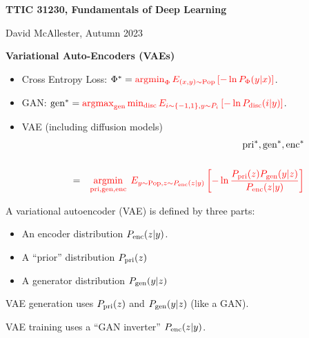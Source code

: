 




{\Huge

  \centerline{\bf TTIC 31230, Fundamentals of Deep Learning}

\bigskip

\centerline{David McAllester, Autumn  2023}

\vfill \vfill

\centerline{\bf Variational Auto-Encoders  (VAEs)}

\vfill \vfill


\begin{itemize}
\item Cross Entropy Loss: $\Phi^* = {\color{red} \operatorname*{argmin}_\Phi E_{(x,y)\sim \mathrm{Pop}}\left[-\ln P_\Phi(y|x)\right]}$.

\vfill
\item GAN: $\mathrm{gen}^* = {\color{red} \operatorname*{argmax}_{\mathrm{gen}} \min_{\mathrm{disc}} E_{i \sim \{-1,1\}, y \sim P_i}\left[-\ln P_{\mathrm{disc}}(i|y)\right]}$.

\vfill
\item VAE (including diffusion models)
\begin{eqnarray*}
& & \mathrm{pri}^*,\mathrm{gen}^*,\mathrm{enc}^* \\
\\
& = & {\color{red} \operatorname*{argmin}_{\mathrm{pri},\mathrm{gen},\mathrm{enc}}\;E_{y \sim \mathrm{Pop},z \sim P_{\mathrm{enc}}(z|y)}\left[ - \ln \frac{P_{\mathrm{pri}}(z)P_{\mathrm{gen}}(y|z)}{P_{\mathrm{enc}}(z|y)}\right]}
\end{eqnarray*}
\end{itemize}

A variational autoencoder (VAE) is defined by three parts:

\vfill
\begin{itemize}
\item An encoder distribution $P_{\mathrm{enc}}(z|y)$.

\vfill
\item A ``prior'' distribution $P_{\mathrm{pri}}(z)$

\vfill
\item A generator distribution $P_{\mathrm{gen}}(y|z)$
\end{itemize}

\vfill
VAE generation uses $P_{\mathrm{pri}}(z)$ and $P_{\mathrm{gen}}(y|z)$ (like a GAN).

\vfill
VAE training uses a ``GAN inverter'' $P_{\mathrm{enc}}(z|y)$.

}

